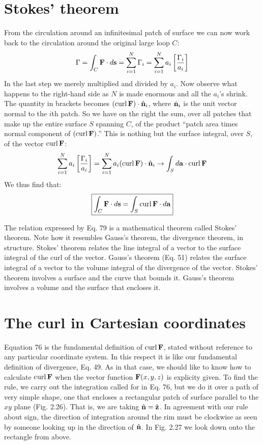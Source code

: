 \section{Stokes' theorem}

From the circulation around an infinitesimal patch of surface we
can now work back to the circulation around the original large
loop $C$:
\begin{equation}
  \Gamma = \int_C \mathbf{F}\cdot d\mathbf{s}
      = \sum_{i=1}^N \Gamma_i
      = \sum_{i=1}^N a_i\left[\frac{\Gamma_i}{a_i}\right]
\end{equation}
In the last step we merely multiplied and divided by $a_i$. Now observe
what happens to the right-hand side as $N$ is made enormous and all
the $a_i$'s shrink. The quantity in brackets becomes $(\operatorname{curl}\mathbf{F})\cdot\hat{\mathbf{n}}_i$,
where $\hat{\mathbf{n}}_i$ is the unit vector normal to the $i$th patch. So we have on
the right the sum, over all patches that make up the entire surface $S$
spanning $C$, of the product ``patch area times normal component of
$(\operatorname{curl}\mathbf{F})$.'' This is nothing but the surface integral, over $S$, of the
vector $\operatorname{curl}\mathbf{F}$:
\begin{equation}
  \sum_{i=1}^N a_i\left[\frac{\Gamma_i}{a_i}\right]
    = \sum_{i=1}^N a_i(\operatorname{curl}\mathbf{F})\cdot\hat{\mathbf{n}}_i
    \rightarrow \int_S d\mathbf{a}\cdot\operatorname{curl}\mathbf{F}
\end{equation}
We thus find that:
\begin{equation}
\boxed{
  \int_C \mathbf{F}\cdot d\mathbf{s} = \int_S \operatorname{curl}\mathbf{F}\cdot d\mathbf{a}
}
\end{equation}

The relation expressed by Eq. 79 is a mathematical theorem called
Stokes' theorem. Note how it resembles Gauss's theorem, the divergence
theorem, in structure. Stokes' theorem relates the line integral
of a vector to the surface integral of the curl of the vector. Gauss's
theorem (Eq. 51) relates the surface integral of a vector to the volume
integral of the divergence of the vector. Stokes' theorem involves
a surface and the curve that bounds it. Gauss's theorem involves a
volume and the surface that encloses it.


\section{The curl in Cartesian coordinates}

Equation 76 is the fundamental definition of $\operatorname{curl}\mathbf{F}$, stated without
reference to any particular coordinate system. In this respect it
is like our fundamental definition of divergence, Eq. 49. As in that
case, we should like to know how to calculate $\operatorname{curl}\mathbf{F}$ when the vector
function $\mathbf{F}(x,y,z)$ is explicity given. To find the rule, we carry out
the integration called for in Eq. 76, but we do it over a path of very
simple shape, one that encloses a rectangular patch of surface parallel
to the $xy$ plane (Fig. 2.26). That is, we are taking $\hat{\mathbf{n}}=\hat{\mathbf{z}}$. In
agreement with our rule about sign, the direction of integration
around the rim must be clockwise as seen by someone looking up
in the direction of $\hat{\mathbf{n}}$. In Fig. 2.27 we look down onto the rectangle
from above.

